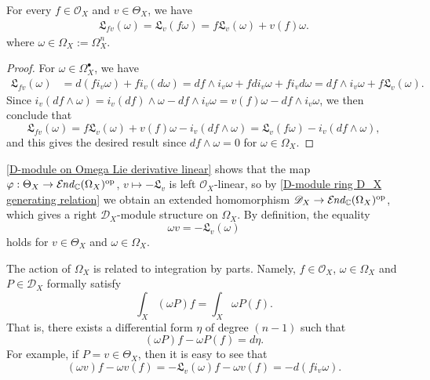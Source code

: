 \begin{lemma}\label{D-module on Omega Lie derivative linear}
For every $f\in\mathscr{O}_X$ and $v\in\Theta_X$, we have
\begin{gather*}
\mathfrak{L}_{fv}(\omega)=\mathfrak{L}_v(f\omega)=f\mathfrak{L}_v(\omega)+v(f)\omega.
\end{gather*}
where $\omega\in\Omega_X:=\Omega_X^n$.
\end{lemma}
\begin{proof}
For $\omega\in\Omega_X^\bullet$, we have
\begin{align*}
\mathfrak{L}_{fv}(\omega)&=d(fi_v\omega)+fi_v(d\omega)=df\wedge i_v\omega+fdi_v\omega+fi_vd\omega=df\wedge i_v\omega+f\mathfrak{L}_v(\omega).
\end{align*}
Since $i_v(df\wedge\omega)=i_v(df)\wedge\omega-df\wedge i_v\omega=v(f)\omega-df\wedge i_v\omega$, we then conclude that
\[\mathfrak{L}_{fv}(\omega)=f\mathfrak{L}_v(\omega)+v(f)\omega-i_v(df\wedge\omega)=\mathfrak{L}_v(f\omega)-i_v(df\wedge\omega),\]
and this gives the desired result since $df\wedge\omega=0$ for $\omega\in\Omega_X$.
\end{proof}

\cref{D-module on Omega Lie derivative linear} shows that the map $\varphi:\Theta_X\to\operatorname{\mathcal{E}\hspace*{-1pt}\textit{nd}\hspace{0.5pt}}_{\mathbb{C}}(\Omega_X)^{\mathrm{op}}$, $v\mapsto -\mathfrak{L}_v$ is left $\mathscr{O}_X$-linear, so by \cref{D-module ring D_X generating relation} we obtain an extended homomorphism $\mathscr{D}_X\to\operatorname{\mathcal{E}\hspace*{-1pt}\textit{nd}\hspace{0.5pt}}_{\mathbb{C}}(\Omega_X)^{\mathrm{op}}$, which gives a right $\mathscr{D}_X$-module structure on $\Omega_X$. By definition, the equality
\[\omega v=-\mathfrak{L}_v(\omega)\]
holds for $v\in\Theta_X$ and $\omega\in\Omega_X$.

\begin{remark}
The action of $\Omega_X$ is related to integration by parts. Namely, $f\in\mathscr{O}_X$, $\omega\in\Omega_X$ and $P\in\mathscr{D}_X$ formally satisfy
\[\int_X(\omega P)f=\int_X\omega P(f).\]
That is, there exists a differential form $\eta$ of degree $(n-1)$ such that
\[(\omega P)f-\omega P(f)=d\eta.\]
For example, if $P=v\in\Theta_X$, then it is easy to see that
\[(\omega v)f-\omega v(f)=-\mathfrak{L}_v(\omega)f-\omega v(f)=-d(fi_v\omega).\]
\end{remark}

